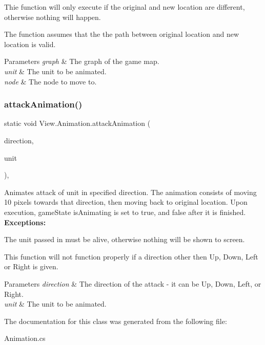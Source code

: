 \begin{DoxyItemize}
\item Thie function will only execute if the original and new location are different, otherwise nothing will happen.
\item The function assumes that the the path between original location and new location is valid. 
\begin{DoxyParams}{Parameters}
{\em graph} & The graph of the game map. \\
\hline
{\em unit} & The unit to be animated. \\
\hline
{\em node} & The node to move to. \\
\hline
\end{DoxyParams}

\end{DoxyItemize}\hypertarget{class_view_1_1_animation_aac990350f0970496abd40f47618d657d}{}\label{class_view_1_1_animation_aac990350f0970496abd40f47618d657d} 
\subsubsection{\texorpdfstring{attack\+Animation()}{attackAnimation()}}
{\footnotesize\ttfamily static void View.\+Animation.\+attack\+Animation (\begin{DoxyParamCaption}\item[{Direction}]{direction,  }\item[{\hyperlink{interface_model_1_1_unit_module_1_1_unit}{Unit}}]{unit }\end{DoxyParamCaption})\hspace{0.3cm}{\ttfamily [inline]}, {\ttfamily [static]}}

Animates attack of unit in specified direction. The animation consists of moving 10 pixels towards that direction, then moving back to original location. Upon execution, game\+State is\+Animating is set to true, and false after it is finished. ~\newline
 {\bfseries Exceptions\+:} ~\newline

\begin{DoxyItemize}
\item The unit passed in must be alive, otherwise nothing will be shown to screen.
\item This function will not function properly if a direction other then Up, Down, Left or Right is given. 
\begin{DoxyParams}{Parameters}
{\em direction} & The direction of the attack -\/ it can be Up, Down, Left, or Right. \\
\hline
{\em unit} & The unit to be animated. \\
\hline
\end{DoxyParams}

\end{DoxyItemize}

The documentation for this class was generated from the following file\+:\begin{DoxyCompactItemize}
\item 
Animation.\+cs\end{DoxyCompactItemize}
